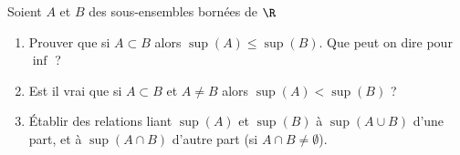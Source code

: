 
\begin{exercice}\label{exo0003}


Soient $A$ et $B$ des sous-ensembles bornées de $\R$
\begin{enumerate}
\item
Prouver que si $A \subset B$ alors $\sup(A) \leq \sup(B)$. Que peut on dire pour $\inf$ ? 
 \item
Est il vrai que si $A \subset B$ et $A \not= B$ alors $\sup(A) < \sup(B)$ ?
\item
Établir des relations liant $\sup(A)$ et $\sup(B)$ à $\sup (A \cup B)$ d'une part, et à $\sup( A \cap B)$ d'autre part (si $A \cap B \not = \emptyset $).

\end{enumerate}

\end{exercice}
